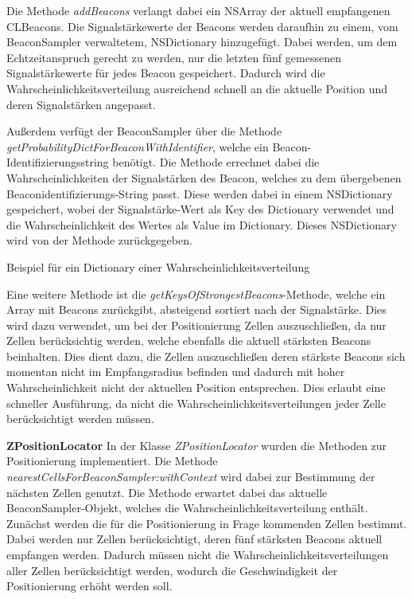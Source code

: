 Die Methode \emph{addBeacons} verlangt dabei ein NSArray der aktuell empfangenen CLBeacons. Die Signalstärkewerte der Beacons werden daraufhin zu einem, vom BeaconSampler verwaltetem, NSDictionary hinzugefügt. Dabei werden, um dem Echtzeitanspruch gerecht zu werden, nur die letzten fünf gemessenen Signalstärkewerte für jedes Beacon gespeichert. Dadurch wird die Wahrscheinlichkeitsverteilung ausreichend schnell an die aktuelle Position und deren Signalstärken angepasst.

Außerdem verfügt der BeaconSampler über die Methode \emph{getProbabilityDictForBeaconWithIdentifier}, welche ein Beacon-Identifizierungsstring benötigt. Die Methode errechnet dabei die Wahrscheinlichkeiten der Signalstärken des Beacon, welches zu dem übergebenen Beaconidentifizierungs-String passt. Diese werden dabei in einem NSDictionary gespeichert, wobei der Signalstärke-Wert als Key des Dictionary verwendet und die Wahrscheinlichkeit des Wertes als Value im Dictionary. Dieses NSDictionary wird von der Methode zurückgegeben.

\begin{listing}[htb!]
    \caption{Beispiel für ein Dictionary einer Wahrscheinlichkeitsverteilung}
	\label{lst:probablities}
\end{listing}

Eine weitere Methode ist die \emph{getKeysOfStrongestBeacons}-Methode, welche ein Array mit Beacons zurückgibt, absteigend sortiert nach der Signalstärke. Dies wird dazu verwendet, um bei der Positionierung Zellen auszuschließen, da nur Zellen berücksichtig werden, welche ebenfalls die aktuell stärksten Beacons beinhalten. Dies dient dazu, die Zellen auszuschließen deren stärkste Beacons sich momentan nicht im Empfangsradius befinden und dadurch mit hoher Wahrscheinlichkeit nicht der aktuellen Position entsprechen. Dies erlaubt eine schneller Ausführung, da nicht die Wahrscheinlichkeitsverteilungen jeder Zelle berücksichtigt werden müssen.



\textbf{ZPositionLocator}
In der Klasse \emph{ZPositionLocator} wurden die Methoden zur Positionierung implementiert. Die Methode \emph{nearestCellsForBeaconSampler:withContext} wird dabei zur Bestimmung der nächsten Zellen genutzt. 
Die Methode erwartet dabei das aktuelle BeaconSampler-Objekt, welches die Wahrscheinlichkeitsverteilung enthält. 
Zunächst werden die für die Positionierung in Frage kommenden Zellen bestimmt. Dabei werden nur Zellen berücksichtigt, deren fünf stärksten Beacons aktuell empfangen werden. Dadurch müssen nicht die Wahrscheinlichkeitsverteilungen aller Zellen berücksichtigt werden, wodurch die Geschwindigkeit der Positionierung erhöht werden soll.

